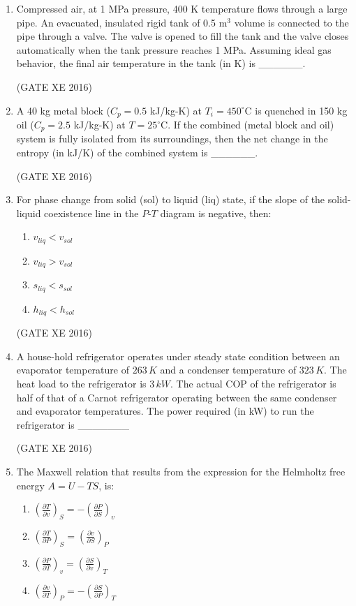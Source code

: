 \documentclass[12pt]{article}
\begin{document}
\begin{enumerate}
(GATE XE 2016)

\item Compressed air, at 1 MPa pressure, 400 K temperature flows through a large pipe. An evacuated, insulated rigid tank of 0.5 m$^3$ volume is connected to the pipe through a valve. The valve is opened to fill the tank and the valve closes automatically when the tank pressure reaches 1 MPa. Assuming ideal gas behavior, the final air temperature in the tank (in K) is \_\_\_\_\_\_.

(GATE XE 2016)

\item A 40 kg metal block ($C_p = 0.5$ kJ/kg-K) at $T_i = 450^\circ$C is quenched in 150 kg oil ($C_p = 2.5$ kJ/kg-K) at $T = 25^\circ$C. If the combined (metal block and oil) system is fully isolated from its surroundings, then the net change in the entropy (in kJ/K) of the combined system is \_\_\_\_\_\_.

(GATE XE 2016)

\item For phase change from solid (sol) to liquid (liq) state, if the slope of the solid-liquid coexistence line in the $P$-$T$ diagram is negative, then:
\begin{multicols}{4}
\begin{enumerate}
\item $v_{liq} < v_{sol}$
\item $v_{liq} > v_{sol}$
\item $s_{liq} < s_{sol}$
\item $h_{liq} < h_{sol}$
\end{enumerate}
\end{multicols}
(GATE XE 2016)

\item A house-hold refrigerator operates under steady state condition between an evaporator temperature of $263 \, K$ and a condenser temperature of $323 \, K$. The heat load to the refrigerator is $3 \, kW$. The actual COP of the refrigerator is half of that of a Carnot refrigerator operating between the same condenser and evaporator temperatures. The power required (in kW) to run the refrigerator is \_\_\_\_\_\_\_

(GATE XE 2016)

\item The Maxwell relation that results from the expression for the Helmholtz free energy $A = U - TS$, is:
\begin{multicols}{2}
\begin{enumerate}
\item $\left(\frac{\partial T}{\partial v}\right)_{S} = - \left(\frac{\partial P}{\partial S}\right)_{v}$
\item $\left(\frac{\partial T}{\partial P}\right)_{S} = \left(\frac{\partial v}{\partial S}\right)_{P}$
\item $\left(\frac{\partial P}{\partial T}\right)_{v} = \left(\frac{\partial S}{\partial v}\right)_{T}$
\item $\left(\frac{\partial v}{\partial T}\right)_{P} = - \left(\frac{\partial S}{\partial P}\right)_{T}$
\end{enumerate}
\end{multicols}


\end{enumerate}
\end{document}
